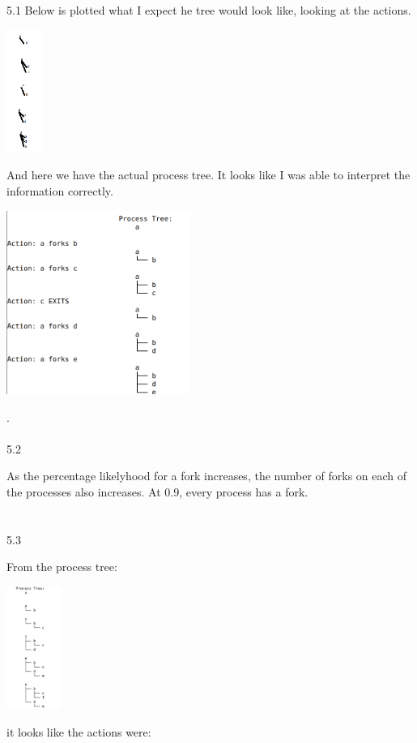 \documentclass[12pt, a4paper]{article}
\begin{document}
5.1
	Below is plotted what I expect he tree would look like, looking at the actions.
	
	\begin{center}
	\includegraphics[height=4cm]{hw1_5_1_a.png}\\
	\end{center}
	
	And here we have the actual process tree. It looks like I was able to interpret the information correctly.
	\begin{center}
	\includegraphics[width=6cm]{hw1_5_1.png}\\
	\end{center}
	. \\ \\ 

5.2

	As the percentage likelyhood for a fork increases, the number of forks on each of the processes also increases. At 0.9, every process has a fork. \\ \\ \\
	
	
5.3

	From the process tree:
	\begin{center}
	\includegraphics[height=4cm]{hw1_5_3.png}\\
	\end{center}
	it looks like the actions were:\\
	
\end{document}
